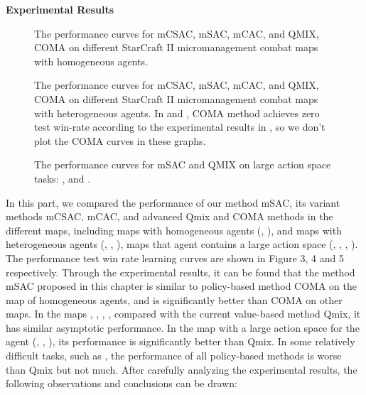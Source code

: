 \documentclass[runningheads]{llncs}
\begin{document}
{\bf Experimental Results}
\begin{figure}[!t]\centering
	\qquad
	\caption{The performance curves for mCSAC, mSAC, mCAC, and QMIX, COMA on different StarCraft II micromanagement combat maps with homogeneous agents.}\label{fig:example}\end{figure}
\begin{figure}[!t]\centering
	\qquad
	\qquad
	\caption{The performance curves for mCSAC, mSAC, mCAC, and QMIX, COMA on different StarCraft II micromanagement combat maps with heterogeneous agents. In  and , COMA method achieves zero test win-rate according to the experimental results in \cite{b18}, so we don't plot the COMA curves in these graphs. }\label{fig:example}\end{figure}
\begin{figure}[!t]\centering
	\qquad
	\qquad
	\caption{The performance curves for mSAC and QMIX on large action space tasks: ,  and . }\label{fig:example}\end{figure}
In this part, we compared the performance of our method mSAC, its variant methods mCSAC, mCAC, and advanced Qmix and COMA methods in the different maps, including
maps with homogeneous agents (, ), and maps with heterogeneous agents (, , ), maps that agent contains a large action space (, , , ).
 The performance test win rate learning curves are shown in Figure 3, 4 and 5 respectively.
Through the experimental results, it can be found that the method mSAC proposed in this chapter is similar to  policy-based method COMA on the map of homogeneous agents, and is significantly better than COMA on other maps. In the maps , , , , compared with the current value-based method Qmix, it has similar asymptotic performance. In the map with a large action space for the agent (, , ), its performance is significantly better than Qmix. In some relatively difficult tasks, such as , the performance of all policy-based methods is worse than Qmix but not much.
After carefully analyzing the experimental results, the following observations and conclusions can be drawn:
\end{document}
